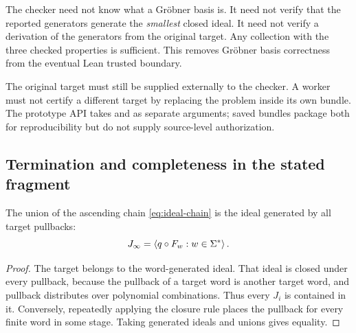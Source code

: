 The checker need not know what a Gr\"obner basis is. It need not verify that the
reported generators generate the \emph{smallest} closed ideal. It need not
verify a derivation of the generators from the original target. Any collection
with the three checked properties is sufficient. This removes Gr\"obner basis
correctness from the eventual Lean trusted boundary.

The original target must still be supplied externally to the checker. A worker
must not certify a different target by replacing the problem inside its own
bundle. The prototype API takes  and  as
separate arguments; saved bundles package both for reproducibility but do not
supply source-level authorization.

\subsection{Termination and completeness in the stated fragment}

\begin{lemma}\label{lem:pullback-ideal}
The union of the ascending chain \eqref{eq:ideal-chain} is the ideal generated
by all target pullbacks:
\[
 J_\infty=\left\langle q\circ F_w:w\in\Sigma^*\right\rangle.
\]
\end{lemma}
\begin{proof}
The target belongs to the word-generated ideal. That ideal is closed under every
pullback, because the pullback of a target word is another target word, and
pullback distributes over polynomial combinations. Thus every $J_i$ is
contained in it. Conversely, repeatedly applying the closure rule places the
pullback for every finite word in some stage. Taking generated ideals and
unions gives equality.
\end{proof}

